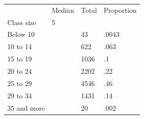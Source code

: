 \documentclass{article}
\begin{document}
\begin{table}[!h]
\centering
\begin{tabular}{llll}
\cline{1-4}
\multicolumn{1}{|l}{} &
  \multicolumn{1}{|l}{Median} &
  \multicolumn{1}{|l}{Total} &
  \multicolumn{1}{|l|}{Proportion} \\
\cline{1-4}
\multicolumn{1}{|l}{Class size} &
  \multicolumn{1}{|l}{5} &
  \multicolumn{1}{|l}{} &
  \multicolumn{1}{|l|}{} \\
\cline{1-4}
\multicolumn{1}{|l}{Below 10} &
  \multicolumn{1}{|l}{} &
  \multicolumn{1}{|l}{43} &
  \multicolumn{1}{|l|}{.0043} \\
\cline{1-4}
\multicolumn{1}{|l}{10 to 14} &
  \multicolumn{1}{|l}{} &
  \multicolumn{1}{|l}{622} &
  \multicolumn{1}{|l|}{.063} \\
\cline{1-4}
\multicolumn{1}{|l}{15 to 19} &
  \multicolumn{1}{|l}{} &
  \multicolumn{1}{|l}{1036} &
  \multicolumn{1}{|l|}{.1} \\
\cline{1-4}
\multicolumn{1}{|l}{20 to 24} &
  \multicolumn{1}{|l}{} &
  \multicolumn{1}{|l}{2202} &
  \multicolumn{1}{|l|}{.22} \\
\cline{1-4}
\multicolumn{1}{|l}{25 to 29} &
  \multicolumn{1}{|l}{} &
  \multicolumn{1}{|l}{4546} &
  \multicolumn{1}{|l|}{.46} \\
\cline{1-4}
\multicolumn{1}{|l}{29 to 34} &
  \multicolumn{1}{|l}{} &
  \multicolumn{1}{|l}{1431} &
  \multicolumn{1}{|l|}{.14} \\
\cline{1-4}
\multicolumn{1}{|l}{35 and more} &
  \multicolumn{1}{|l}{} &
  \multicolumn{1}{|l}{20} &
  \multicolumn{1}{|l|}{.002} \\
\cline{1-4}
\end{tabular}
\end{table}
\end{document}
